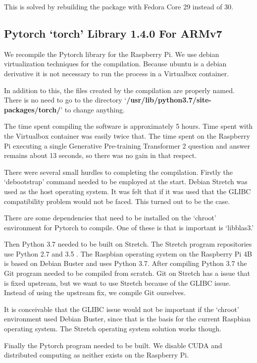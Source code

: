 This is solved by rebuilding the package with Fedora Core 29 instead of 30. 
 
\subsection{Pytorch `torch' Library 1.4.0 For ARMv7}
We recompile the Pytorch library for the Raspberry Pi. We use debian virtualization techniques for the compilation. Because ubuntu is a debian derivative it is not necessary to run the process in a Virtualbox container. 

In addition to this, the files created by the compilation are properly named. There is no need to go to the directory `\textbf{/usr/lib/python3.7/site-packages/torch/}' to change anything. 

The time spent compiling the software is approximately 5 hours. Time spent with the Virtualbox container was easily twice that. The time spent on the Raspberry Pi executing a single Generative Pre-training Transformer 2 question and answer remains about 13 seconds, so there was no gain in that respect.

There were several small hurdles to completing the compilation. Firstly the `debootstrap' command needed to be employed at the start. Debian Stretch was used as the host operating system. It was felt that if it was used that the GLIBC compatibility problem would not be faced. This turned out to be the case.

There are some dependencies that need to be installed on the `chroot' environment for Pytorch to compile. One of these is that is important is `libblas3.'

Then Python 3.7 needed to be built on Stretch. The Stretch program repositories use Python 2.7 and 3.5 . The Raspbian operating system on the Raspberry Pi 4B is based on Debian Buster and uses Python 3.7. After compiling Python 3.7 the Git program needed to be compiled from scratch. Git on Stretch has a issue that is fixed upstream, but we want to use Stretch because of the GLIBC issue. Instead of using the upstream fix, we compile Git ourselves.

It is conceivable that the GLIBC issue would not be important if the `chroot' environment used Debian Buster, since that is the basis for the current Raspbian operating system. The Stretch operating system solution works though.

Finally the Pytorch program needed to be built. We disable CUDA and distributed computing as neither exists on the Raspberry Pi.

